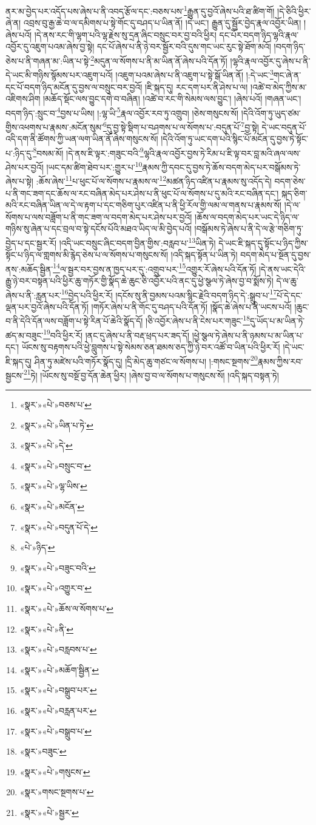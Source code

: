 ནར་མ་བྱེད་པར་འདོད་པས་ཞེས་པ་ནི་འབད་རྩོལ་དང་:བཅས་པས་\footnote{«སྣར་»«པེ་»བཅས་པ་}རྒྱུན་དུ་བྱའོ་ཞེས་པའི་ཐ་ཚིག་གོ། །དེ་ཅིའི་ཕྱིར་ཞེ་ན། འབྲས་བུ་རྒྱ་ཆེ་བ་ལ་དམིགས་པ་སྟེ་གོང་དུ་བཤད་པ་ཡིན་ནོ། །དེ་ཡང་། རྒྱུན་དུ་སྦྱོར་བྱེད་རྣལ་འབྱོར་ཡིན། །ཞེས་པའོ། །དེ་ནས་རང་གི་ལྷག་པའི་ལྷ་རྗེས་སུ་དྲན་ཞིང་བསྲུང་བར་བྱ་བའི་ཕྱིར། དང་པོར་བདག་ཉིད་ལྷའི་རྣལ་འབྱོར་དུ་འཇུག་པའམ་ཞེས་བྱ་སྟེ། དང་པོ་ཞེས་པ་ནི་ཉེ་བར་སྦྱོར་བའི་དུས་གང་ཡང་རུང་སྟེ་ཐོག་མའོ། །བདག་ཉིད་ཅེས་པ་ནི་གཞན་མ་:ཡིན་པ་སྟེ་\footnote{«སྣར་»«པེ་»ཡིན་པ་ཏེ་}མདུན་ལ་སོགས་པ་ནི་མ་ཡིན་ནོ་ཞེས་པའི་དོན་ཏོ། །ལྷའི་རྣལ་འབྱོར་དུ་ཞེས་པ་ནི་དེ་ཡང་མི་གཉིས་སྙོམས་པར་འཇུག་པའོ། །འཇུག་པའམ་ཞེས་པ་ནི་འཇུག་པ་སྟེ་སྒོ་ཡིན་ནོ། །:དེ་ཡང་\footnote{«སྣར་»«པེ་»དེ་}གང་ཞེ་ན་དང་པོ་བདག་ཉིད་མངོན་དུ་བྱས་ལ་བསྲུང་བར་བྱའོ། །ཇི་སྐད་དུ། རང་དག་པར་ནི་ཤེས་པ་ལ། །འཚེ་བ་མེད་ཀྱིས་མ་འཇིགས་ཤིག །མཆོད་སྡོང་ལས་བྱུང་དགེ་བ་བཞིན། །འཚེ་བ་རང་གི་སེམས་ལས་བྱུང་། །ཞེས་པའོ། །གཞན་ཡང་། བདག་ཉིད་:སྲུང་བ་\footnote{«སྣར་»«པེ་»བསྲུང་བ་}བྱས་པ་ཡིས། །:ལྷ་ཡི་\footnote{«སྣར་»«པེ་»ལྷ་ཡིས་}རྣལ་འབྱོར་རབ་ཏུ་འགྲུབ། །ཅེས་གསུངས་སོ། །དེའི་འོག་ཏུ་ཡུད་ཙམ་གྱིས་འཕགས་པ་རྣམས་:མངོན་སུམ་\footnote{«སྣར་»«པེ་»མངོན་}དུ་བྱ་སྟེ་སྡིག་པ་བཤགས་པ་ལ་སོགས་པ་:བདུན་པོ་\footnote{«སྣར་»«པེ་»བདུན་པོ་དེ་}བྱ་སྟེ། དེ་ཡང་བདུན་པོ་འདི་དག་ནི་ཚོགས་ཀྱི་ཡན་ལག་ཡིན་ནོ་ཞེས་གསུངས་སོ། །དེའི་འོག་ཏུ་ཡང་དག་པའི་སྙིང་པོ་མངོན་དུ་བྱས་ཏེ་སྟོང་པ་:ཉིད་དུ་\footnote{«པེ་»ཉིད་}བསམ་མོ། །དེ་ནས་ཇི་ལྟར་:གཟུང་བའི་\footnote{«སྣར་»«པེ་»བཟུང་བའི་}ལྷའི་རྣལ་འབྱོར་བྱས་ཏེ་རིམ་པ་ཇི་ལྟ་བར་བླ་མའི་ཞལ་ལས་ཤེས་པར་བྱའོ། །ཡང་དམ་ཚིག་ཐེབ་པར་:གྱུར་པ་\footnote{«སྣར་»«པེ་»འགྱུར་བ་}རྣམས་ཀྱི་དབང་དུ་བྱས་ཏེ་ཆོས་བདག་མེད་པར་བསྒོམས་ཏེ་ཞེས་པ་སྟེ། :ཆོས་ཞེས་\footnote{«སྣར་»«པེ་»ཆོས་ལ་སོགས་པ་}པ་ཕུང་པོ་ལ་སོགས་པ་རྣམས་ལ་\footnote{«སྣར་»«པེ་»ནི་}མཚན་ཉིད་འཛིན་པ་རྣམས་སུ་འདོད་དེ། བདག་ཅེས་པ་ནི་གང་ཟག་དང་ཆོས་ལ་རང་བཞིན་མེད་པར་ཤེས་པ་ནི་ཕུང་པོ་ལ་སོགས་པ་དུ་མའི་རང་བཞིན་དང་། སྐད་ཅིག་མའི་རང་བཞིན་ཡིན་ལ་དེ་ལ་རྟག་པ་དང་གཅིག་པུར་འཛིན་པ་ནི་ཕྱི་རོལ་གྱི་ལམ་ལ་གནས་པ་རྣམས་སོ། །དེ་ལ་སོགས་པ་ལས་བཟློག་པ་ནི་གང་ཟག་ལ་བདག་མེད་པར་ཤེས་པར་བྱའོ། །ཆོས་ལ་བདག་མེད་པར་ཡང་དེ་ཉིད་ལ་གཉིས་སུ་ཞེན་པ་དང་བྲལ་བ་སྟེ་དངོས་པོའི་མཐའ་ཡིད་ལ་མི་བྱེད་པའོ། །བསྒོམས་ཏེ་ཞེས་པ་ནི་དེ་ལ་རྩེ་གཅིག་ཏུ་བྱེད་པ་དང་སྦྱར་རོ། །འདི་ཡང་བསྲུང་ཞིང་བདག་བྱིན་གྱིས་:བརླབ་པ་\footnote{«སྣར་»«པེ་»བརླབས་པ་}ཡིན་ཏེ། དེ་ཡང་ཇི་སྐད་དུ་སྟོང་པ་ཉིད་ཀྱིས་སྟོང་པ་ཉིད་ལ་གླགས་མི་རྙེད་ཅེས་པ་ལ་སོགས་པ་གསུངས་སོ། །འདི་སྐད་སྟོན་པ་ཡིན་ཏེ། བདག་མེད་པ་སྔོན་དུ་བྱས་ནས་:མཆོད་སྦྱིན་\footnote{«སྣར་»«པེ་»མཆོག་སྦྱིན་}ལ་སྦྱར་བར་བྱས་ན་ཁྱད་པར་དུ་:འགྲུབ་པར་\footnote{«སྣར་»«པེ་»བསྒྲུབ་པར་}འགྱུར་རོ་ཞེས་པའི་དོན་ཏོ། །དེ་ནས་ཡང་དེའི་རྒྱུ་ཉེ་བར་བསྟན་པའི་ཕྱིར་ཆུ་གཏོར་གྱི་སྣོད་ཆེ་ཆུང་ཅི་འབྱོར་པའི་ནང་དུ་ཕྱེ་སྩལ་ཏེ་ཞེས་བྱ་བ་སྨོས་ཏེ། དེ་ལ་ཆུ་ཞེས་པ་ནི་:རླན་པར་\footnote{«སྣར་»«པེ་»བརླན་པར་}བྱེད་པའི་ཕྱིར་རོ། །དངོས་སུ་ནི་བྱམས་པའམ་སྙིང་རྗེའི་བདག་ཉིད་དེ་:སྒྲུབ་པ་\footnote{«སྣར་»«པེ་»བསྒྲུབ་པ་}པོ་དེ་དང་ལྡན་པར་བྱའོ་ཞེས་པའི་དོན་ཏོ། །གཏོར་ཞེས་པ་ནི་གོང་དུ་བཤད་པའི་དོན་ཏོ། །སྣོད་ཆེ་ཞེས་པ་ནི་ཡངས་པའོ། །ཆུང་བ་ནི་དེའི་དོན་ལས་བཟློག་པ་སྟེ་རིན་པོ་ཆེའི་སྣོད་དོ། །ཅི་འབྱོར་ཞེས་པ་ནི་ངེས་པར་གཟུང་\footnote{«སྣར་»བཟུང་}དུ་ཡོད་པ་མ་ཡིན་ཏེ་ཚད་མ་བཟུང་\footnote{«སྣར་»«པེ་»གསུངས་}བའི་ཕྱིར་རོ། །ནང་དུ་ཞེས་པ་ནི་བརྡ་ཕྲད་པར་ཟད་དོ། །ཕྱེ་སྩལ་ཏེ་ཞེས་པ་ནི་ཉམས་པ་མ་ཡིན་པ་དང་། ཡོངས་སུ་བརྟགས་པའི་ཕྱེ་བླུགས་པ་སྟེ་སེམས་ཅན་ཐམས་ཅད་ཀྱི་ཉེ་བར་འཚོ་བ་ཡིན་པའི་ཕྱིར་རོ། །དེ་ཡང་ཇི་སྐད་དུ། ཤིན་ཏུ་མཛེས་པའི་གཏོར་སྣོད་དུ། །དྲི་མེད་ཆུ་གཙང་ལ་སོགས་པ། །:གསང་སྔགས་\footnote{«སྣར་»གསང་སྔགས་པ་}རྣམས་ཀྱིས་རབ་སྦྱངས་\footnote{«སྣར་»«པེ་»སྦྱར་}ཏེ། །ཡོངས་སུ་བསྔོ་བྱ་དོན་ཆེན་ཕྱིར། །ཞེས་བྱ་བ་ལ་སོགས་པ་གསུངས་སོ། །འདི་སྐད་བསྟན་ཏེ། 